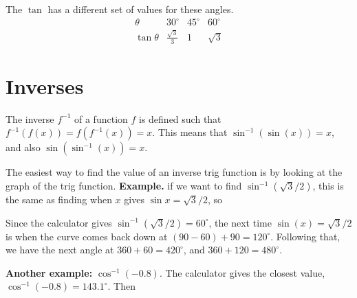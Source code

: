 \documentclass{article}
\begin{document}
The $\tan$ has a different set of values for these angles.
\[
\begin{array}{c|c|c|c}
    \theta & 30^\circ & 45^\circ & 60^\circ\\
    \hline
    \tan\theta & \frac{\sqrt{3}}{3} & 1 & \sqrt{3}
\end{array}
\]


\section{Inverses}

The inverse $f^{-1}$ of a function $f$ is defined such that $f^{-1}(f(x))=f(f^{-1}(x))=x$. This means that $\sin^{-1}(\sin(x))=x$, and also $\sin(\sin^{-1}(x))=x$.

The easiest way to find the value of an inverse trig function is by looking at the graph of the trig function. \textbf{Example.} if we want to find $\sin^{-1}(\sqrt{3}/2)$, this is the same as finding when $x$ gives $\sin x=\sqrt{3}/2$, so

\begin{figure}[H]
    \centering
\end{figure}

Since the calculator gives $\sin^{-1}(\sqrt{3}/2)=60^\circ$, the next time $\sin(x)=\sqrt{3}/2$ is when the curve comes back down at $(90-60)+90 = 120^\circ$. Following that, we have the next angle at $360+60 = 420^\circ$, and $360+120=480^\circ$.

\textbf{Another example:} $\cos^{-1}(-0.8)$. The calculator gives the closest value, $\cos^{-1}(-0.8)=143.1^\circ$. Then

\begin{figure}[H]
    \centering
\end{figure}
\end{document}
